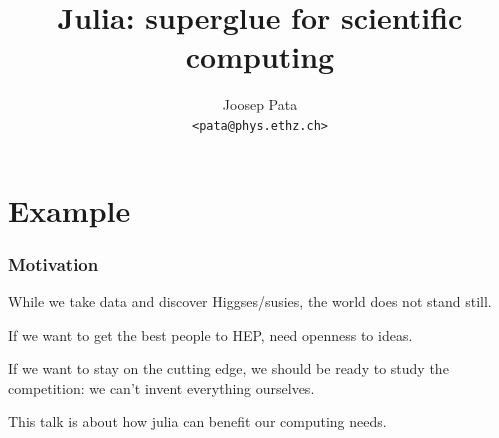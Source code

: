 \documentclass[16pt]{beamer}
\author[Joosep Pata]{Joosep Pata\\ \texttt{<pata@phys.ethz.ch>}}
\institute[ETHz]{ETH Zürich, Institute of Particle Physics}
\title{Julia: superglue for scientific computing}
\begin{document}
\frame{

\titlepage

}


\section{Example}


\begin{frame}[fragile]
\frametitle{Motivation}

\begin{center}
While we take data and discover Higgses/susies, the world does not stand still.
\end{center}

\vspace{.3cm}
\begin{center}
If we want to get the best people to HEP, need openness to ideas.
\end{center}

\vspace{.3cm}
\begin{center}
If we want to stay on the cutting edge, we should be ready to study the competition: we can't invent everything ourselves.
\end{center}

\vspace{.3cm}
\begin{center}
This talk is about how julia can benefit our computing needs.
\end{center}


\end{frame}
\end{document}

